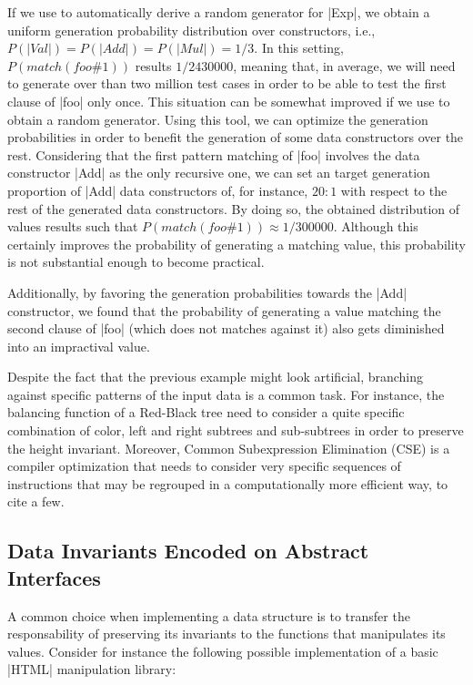 If we use \megadeth to automatically derive a random generator for |Exp|, we
obtain a uniform generation probability distribution over constructors, i.e.,
$P(|Val|) = P(|Add|) = P(|Mul|) = 1/3$.
%
In this setting, $P(match(foo\#1))$ results $1/2430000$, meaning that, in
average, we will need to generate over than two million test cases in order to
be able to test the first clause of |foo| only once.
%
This situation can be somewhat improved if we use \dragen to obtain a random
generator.
%
Using this tool, we can optimize the generation probabilities in order to
benefit the generation of some data constructors over the rest.
%
Considering that the first pattern matching of |foo| involves the data
constructor |Add| as the only recursive one, we can set an target generation
proportion of |Add| data constructors of, for instance, $20:1$ with respect to
the rest of the generated data constructors.
%
By doing so, the obtained distribution of values results such that
$P(match(foo\#1)) \approx 1/300000$.
%
Although this certainly improves the probability of generating a matching value,
this probability is not substantial enough to become practical.


Additionally, by favoring the generation probabilities towards the |Add|
constructor, we found that the probability of generating a value matching the
second clause of |foo| (which does not matches against it) also gets diminished
into an impractival value.


Despite the fact that the previous example might look artificial, branching
against specific patterns of the input data is a common task.
%
For instance, the balancing function of a Red-Black tree need to consider a
quite specific combination of color, left and right subtrees and sub-subtrees
in order to preserve the height invariant.
%
Moreover, Common Subexpression Elimination (CSE) is a compiler optimization that
needs to consider very specific sequences of instructions that may be regrouped
in a computationally more efficient way, to cite a few.



\subsection*{\textbf{Data Invariants Encoded on Abstract Interfaces}}

A common choice when implementing a data structure is to transfer the
responsability of preserving its invariants to the functions that manipulates
its values.
%
Consider for instance the following possible implementation of a basic |HTML|
manipulation library:

